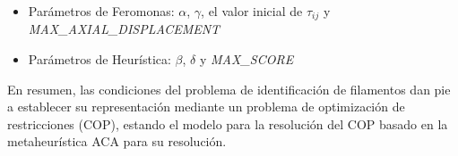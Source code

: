 
\begin{itemize}
    \item Par\'ametros de Feromonas: $\alpha$, $\gamma$, el valor inicial de $\tau_{ij}$ y {\it MAX\_AXIAL\_DISPLACEMENT}
    \item Par\'ametros de Heur\'istica: $\beta$, $\delta$ y {\it MAX\_SCORE}
\end{itemize}


En resumen, las condiciones del problema de identificaci\'on de filamentos dan pie a establecer su representaci\'on mediante un problema de optimizaci\'on de restricciones (COP), estando el modelo para la resoluci\'on del COP basado en la metaheur\'istica ACA para su resoluci\'on.